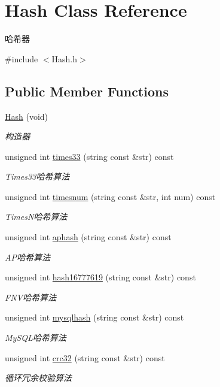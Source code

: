 \hypertarget{class_hash}{}\section{Hash Class Reference}
\label{class_hash}


哈希器  




{\ttfamily \#include $<$Hash.\+h$>$}

\subsection*{Public Member Functions}
\begin{DoxyCompactItemize}
\item 
\mbox{\label{class_hash_a73664aa35c78765aff5ef005db70d245}} 
\hyperlink{class_hash_a73664aa35c78765aff5ef005db70d245}{Hash} (void)
\begin{DoxyCompactList}\small\item\em 构造器 \end{DoxyCompactList}\item 
unsigned int \hyperlink{class_hash_a0600339cc7fef22914aab8e066f91fae}{times33} (string const \&str) const
\begin{DoxyCompactList}\small\item\em Times33哈希算法 \end{DoxyCompactList}\item 
unsigned int \hyperlink{class_hash_a67ee2152ea8e40b60b2c395c83cecc6f}{timesnum} (string const \&str, int num) const
\begin{DoxyCompactList}\small\item\em Times\+N哈希算法 \end{DoxyCompactList}\item 
unsigned int \hyperlink{class_hash_a05d68fb8603e00eb7b2bce77fd6539c5}{aphash} (string const \&str) const
\begin{DoxyCompactList}\small\item\em A\+P哈希算法 \end{DoxyCompactList}\item 
unsigned int \hyperlink{class_hash_a87064dbb105ec1193050067e1eb564f5}{hash16777619} (string const \&str) const
\begin{DoxyCompactList}\small\item\em F\+N\+V哈希算法 \end{DoxyCompactList}\item 
unsigned int \hyperlink{class_hash_a1a557f44997810270c6d753802a22743}{mysqlhash} (string const \&str) const
\begin{DoxyCompactList}\small\item\em My\+S\+Q\+L哈希算法 \end{DoxyCompactList}\item 
unsigned int \hyperlink{class_hash_afc6d940f27dc7f056cd41c171bd46b4c}{crc32} (string const \&str) const
\begin{DoxyCompactList}\small\item\em 循环冗余校验算法 \end{DoxyCompactList}\end{DoxyCompactItemize}


